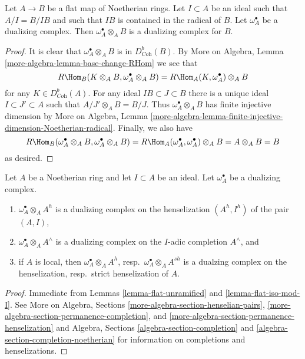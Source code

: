 \begin{lemma}
\label{lemma-flat-iso-mod-I}
Let $A \to B$ be a flat map of Noetherian rings. Let
$I \subset A$ be an ideal such that $A/I = B/IB$ and
such that $IB$ is contained in the radical of $B$.
Let $\omega_A^\bullet$ be a dualizing complex.
Then $\omega_A^\bullet \otimes_A B$ is a dualizing
complex for $B$.
\end{lemma}

\begin{proof}
It is clear that $\omega_A^\bullet \otimes_A B$ is in $D^b_{\textit{Coh}}(B)$.
By More on Algebra, Lemma \ref{more-algebra-lemma-base-change-RHom}
we see that
$$
R\Hom_B(K \otimes_A B, \omega_A^\bullet \otimes_A B) =
R\Hom_A(K, \omega_A^\bullet) \otimes_A B
$$
for any $K \in D^b_{\textit{Coh}}(A)$. For any ideal
$IB \subset J \subset B$ there is a unique ideal $I \subset J' \subset A$
such that $A/J' \otimes_A B = B/J$. Thus $\omega_A^\bullet \otimes_A B$
has finite injective dimension by
More on Algebra, Lemma
\ref{more-algebra-lemma-finite-injective-dimension-Noetherian-radical}.
Finally, we also have
$$
R\Hom_B(\omega_A^\bullet \otimes_A B, \omega_A^\bullet \otimes_A B) =
R\Hom_A(\omega_A^\bullet, \omega_A^\bullet) \otimes_A B = A \otimes_A B = B
$$
as desired.
\end{proof}

\begin{lemma}
\label{lemma-completion-henselization-dualizing}
Let $A$ be a Noetherian ring and let $I \subset A$ be an ideal.
Let $\omega_A^\bullet$ be a dualizing complex.
\begin{enumerate}
\item $\omega_A^\bullet \otimes_A A^h$ is a dualizing complex on the
henselization $(A^h, I^h)$ of the pair $(A, I)$,
\item $\omega_A^\bullet \otimes_A A^\wedge$ is a dualizing complex on
the $I$-adic completion $A^\wedge$, and
\item if $A$ is local, then $\omega_A^\bullet \otimes_A A^h$,
resp.\ $\omega_A^\bullet \otimes_A A^{sh}$ is a dualzing complex
on the henselization, resp.\ strict henselization of $A$.
\end{enumerate}
\end{lemma}

\begin{proof}
Immediate from Lemmas \ref{lemma-flat-unramified} and
\ref{lemma-flat-iso-mod-I}.
See More on Algebra, Sections \ref{more-algebra-section-henselian-pairs},
\ref{more-algebra-section-permanence-completion}, and
\ref{more-algebra-section-permanence-henselization} and
Algebra, Sections \ref{algebra-section-completion} and
\ref{algebra-section-completion-noetherian}
for information on completions and henselizations.
\end{proof}

